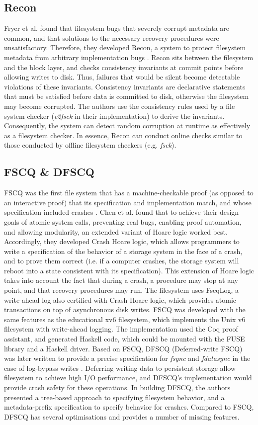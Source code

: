 \subsection{Recon}
Fryer et al. found that filesystem bugs that severely corrupt metadata are common, and that solutions to the necessary recovery procedures were unsatisfactory.
Therefore, they developed Recon, a system to protect filesystem metadata from arbitrary implementation bugs \cite{fryer2012}.
Recon sits between the filesystem and the block layer, and checks consistency invariants at commit points before allowing writes to disk.
Thus, failures that would be silent become detectable violations of these invariants.
Consistency invariants are declarative statements that must be satisfied before data is committed to disk, otherwise the filesystem may become corrupted.
The authors use the consistency rules used by a file system checker (\textit{e2fsck} in their implementation) to derive the invariants.
Consequently, the system can detect random corruption at runtime as effectively as a filesystem checker.
In essence, Recon can conduct online checks similar to those conducted by offline filesystem checkers (e.g. \textit{fsck}).

\subsection{FSCQ \& DFSCQ}
FSCQ was the first file system that has a machine-checkable proof (as opposed to an interactive proof) that its specification and implementation match, and whose specification included crashes \cite{chen2015}.
Chen et al. found that to achieve their design goals of atomic system calls, preventing real bugs, enabling proof automation, and allowing modularity, an extended variant of Hoare logic worked best.
Accordingly, they developed Crash Hoare logic, which allows programmers to write a specification of the behavior of a storage system in the face of a crash, and to prove them correct (i.e. if a computer crashes, the storage system will reboot into a state consistent with its specification).
This extension of Hoare logic takes into account the fact that during a crash, a procedure may stop at any point, and that recovery procedures may run.
The filesystem uses FscqLog, a write-ahead log also certified with Crash Hoare logic, which provides atomic transactions on top of asynchronous disk writes.
FSCQ was developed with the same features as the educational xv6 filesystem, which implements the Unix v6 filesystem with write-ahead logging.
The implementation used the Coq proof assistant, and generated Haskell code, which could be mounted with the FUSE library and a Haskell driver.
Based on FSCQ, DFSCQ (Deferred-write FSCQ) was later written to provide a precise specification for \textit{fsync} and \textit{fdatasync} in the case of log-bypass writes \cite{chen2017}.
Deferring writing data to persistent storage allow filesystem to achieve high I/O performance, and DFSCQ's implementation would provide crash safety for these operations.
In building DFSCQ, the authors presented a tree-based approach to specifying filesystem behavior, and a metadata-prefix specification to specify behavior for crashes.
Compared to FSCQ, DFSCQ has several optimisations and provides a number of missing features.

